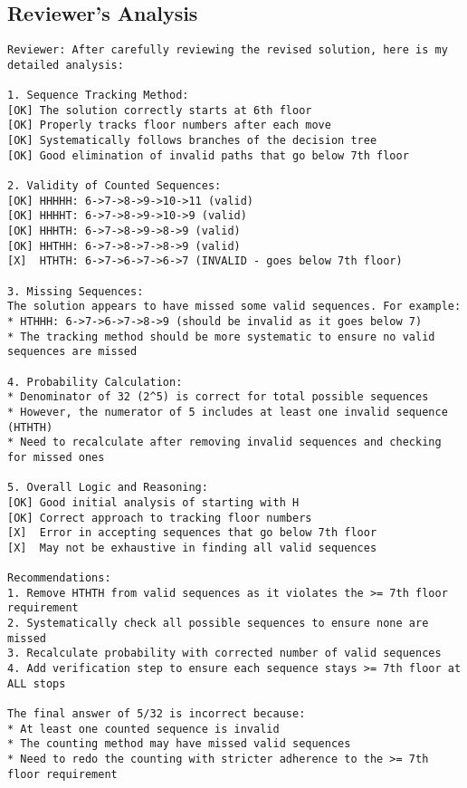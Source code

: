 \subsection{Reviewer's Analysis}
\vspace{-0.5em}
\begin{reviewerbox}
\begin{lstlisting}
Reviewer: After carefully reviewing the revised solution, here is my detailed analysis:

1. Sequence Tracking Method:
[OK] The solution correctly starts at 6th floor
[OK] Properly tracks floor numbers after each move
[OK] Systematically follows branches of the decision tree
[OK] Good elimination of invalid paths that go below 7th floor

2. Validity of Counted Sequences:
[OK] HHHHH: 6->7->8->9->10->11 (valid)
[OK] HHHHT: 6->7->8->9->10->9 (valid)
[OK] HHHTH: 6->7->8->9->8->9 (valid)
[OK] HHTHH: 6->7->8->7->8->9 (valid)
[X]  HTHTH: 6->7->6->7->6->7 (INVALID - goes below 7th floor)

3. Missing Sequences:
The solution appears to have missed some valid sequences. For example:
* HTHHH: 6->7->6->7->8->9 (should be invalid as it goes below 7)
* The tracking method should be more systematic to ensure no valid sequences are missed

4. Probability Calculation:
* Denominator of 32 (2^5) is correct for total possible sequences
* However, the numerator of 5 includes at least one invalid sequence (HTHTH)
* Need to recalculate after removing invalid sequences and checking for missed ones

5. Overall Logic and Reasoning:
[OK] Good initial analysis of starting with H
[OK] Correct approach to tracking floor numbers
[X]  Error in accepting sequences that go below 7th floor
[X]  May not be exhaustive in finding all valid sequences

Recommendations:
1. Remove HTHTH from valid sequences as it violates the >= 7th floor requirement
2. Systematically check all possible sequences to ensure none are missed
3. Recalculate probability with corrected number of valid sequences
4. Add verification step to ensure each sequence stays >= 7th floor at ALL stops

The final answer of 5/32 is incorrect because:
* At least one counted sequence is invalid
* The counting method may have missed valid sequences
* Need to redo the counting with stricter adherence to the >= 7th floor requirement

\end{lstlisting}
\end{reviewerbox}

